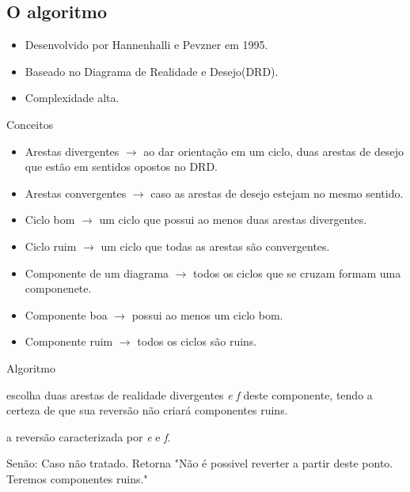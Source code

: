 \documentclass{beamer}
\begin{document}
\subsection{O algoritmo}

\begin{frame}
	\begin{itemize}
		\item Desenvolvido por Hannenhalli e Pevzner em 1995.
		\item Baseado no Diagrama de Realidade e Desejo(DRD).
 		\item Complexidade alta.
	\end{itemize}
\end{frame}

\begin{frame}{Conceitos}
	\begin{itemize}
		\item Arestas divergentes $\to$ ao dar orientação em um ciclo, duas arestas de desejo que estão em sentidos opostos no DRD.
		\pause \item Arestas convergentes $\to$ caso as arestas de desejo estejam no mesmo sentido.
		\pause \item Ciclo bom $\to$ um ciclo que possui ao menos duas arestas divergentes.
		\pause \item Ciclo ruim $\to$ um ciclo que todas as arestas são convergentes.
		\pause \item Componente de um diagrama $\to$ todos os ciclos que se cruzam formam uma componenete.
		\pause \item Componente boa $\to$ possui ao menos um ciclo bom.
		\pause \item Componente ruim $\to$ todos os ciclos são ruins.
	\end{itemize}
\end{frame}

\begin{frame}
	\begin{block} {Algoritmo}
		\begin{algorithm}[H]
		
			 {
				escolha duas arestas de realidade divergentes \emph{e} \emph{f} deste componente, tendo a certeza de que sua reversão não criará componentes ruins.
				
				\Return a reversão caracterizada por \emph{e} e \emph{f}.
			}
			Senão: Caso não tratado. Retorna "Não é possivel reverter a partir deste ponto. Teremos componentes ruins."
		\end{algorithm}
	\end{block}
\end{frame}
\end{document}
